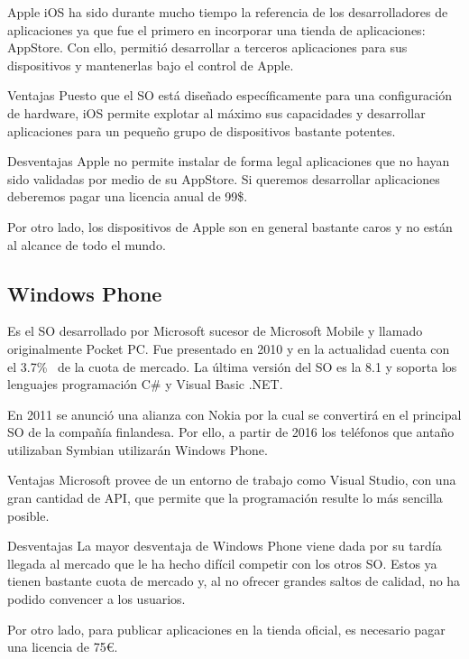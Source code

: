 Apple iOS ha sido durante mucho tiempo la referencia de los desarrolladores de aplicaciones ya que
fue el primero en incorporar una tienda de aplicaciones: AppStore. Con ello, permitió desarrollar a
terceros aplicaciones para sus dispositivos y mantenerlas bajo el control de Apple.

\begin{definitionlist}
  \item[Ventajas] Puesto que el \acs{SO} está diseñado específicamente para una configuración de
    hardware, iOS permite explotar al máximo sus capacidades y desarrollar aplicaciones para un
    pequeño grupo de dispositivos bastante potentes.

  \item[Desventajas] Apple no permite instalar de forma legal aplicaciones que no hayan sido
    validadas por medio de su AppStore. Si queremos desarrollar aplicaciones deberemos pagar una
    licencia anual de 99\$.

    Por otro lado, los dispositivos de Apple son en general bastante caros y no están al alcance de
    todo el mundo.

\end{definitionlist}

\subsection{Windows Phone}

Es el \acs{SO} desarrollado por Microsoft sucesor de Microsoft Mobile y llamado originalmente Pocket
PC. Fue presentado en 2010 y en la actualidad cuenta con el 3.7\%~\cite{Llamas13} de la cuota de
mercado. La última versión del \acs{SO} es la 8.1 y soporta los lenguajes programación C\# y Visual
Basic .NET.

En 2011 se anunció una alianza con Nokia por la cual se convertirá en el principal \acs{SO} de la
compañía finlandesa. Por ello, a partir de 2016 los teléfonos que antaño utilizaban Symbian
utilizarán Windows Phone.

\begin{definitionlist}
  \item[Ventajas] Microsoft provee de un entorno de trabajo como Visual Studio, con una gran
    cantidad de \acf{API}, que permite que la programación resulte lo más sencilla posible.

  \item[Desventajas] La mayor desventaja de Windows Phone viene dada por su tardía llegada al
    mercado que le ha hecho difícil competir con los otros \acs{SO}. Estos ya tienen bastante cuota
    de mercado y, al no ofrecer grandes saltos de calidad, no ha podido convencer a los usuarios.

    Por otro lado, para publicar aplicaciones en la tienda oficial, es necesario pagar una licencia
    de 75\euro{}.

\end{definitionlist}

